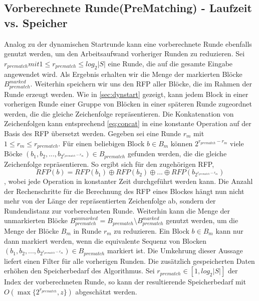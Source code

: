 \subsection{Vorberechnete Runde(PreMatching) - Laufzeit vs. Speicher}
Analog zu der dynamischen Startrunde kann eine vorberechnete Runde ebenfalls genutzt werden, um den Arbeitsaufwand vorheriger Runden zu reduzieren. Sei $r_{prematch} mit 
1\leq r_{prematch} \leq log_2{|S|}$ eine Runde, die auf die gesamte Eingabe angewendet wird. Als Ergebnis erhalten wir die Menge der markierten Blöcke $B_{prematch}^{marked}$.
Weiterhin speichern wir uns den RFP aller Blöcke, die im Rahmen der Runde erzeugt werden. Wie in \ref{sec:dynstart} gezeigt, kann jedem Block in einer vorherigen Runde einer Gruppe
von Blöcken in einer späteren Runde zugeordnet werden, die die gleiche Zeichenfolge repräsentieren. Die Konkatenation von Zeichenfolgen kann entsprechend \ref{eq:concat} in eine
konstante Operation auf der Basis des RFP übersetzt werden. Gegeben sei eine Runde $r_m$ mit $1\leq r_m \leq r_{prematch}$. Für einen beliebigen Block $b \in B_m$ können 
$2^{r_{prematch}-r_m}$ viele Böcke $(b_1, b_2, ..., b_{2^{r_{prematch}-r_m}})\in B_{prematch}$ gefunden werden, die die gleiche Zeichenfolge repräsentieren. So ergibt sich für den 
zugehörigen RFP,
\begin{equation}
    RFP(b) = RFP(b_1) \oplus RFP(b_2) \oplus ... \oplus RFP(b_{2^{r_{prematch}-r_m}})
\end{equation}
, wobei jede Operation in konstanter Zeit durchgeführt werden kann. Die Anzahl der Rechenschritte für die Berechnung des RFP eines Blockes hängt nun nicht mehr von der Länge der
repräsentierten Zeichenfolge ab, sondern der Rundendistanz zur vorberechneten Runde.
Weiterhin kann die Menge der unmarkierten Blöcke $B_{prematch}^{unmarked}=B_{prematch}\setminus B_{prematch}^{marked}$ genutzt werden, um die Menge der Blöcke $B_m$ in Runde $r_m$
zu reduzieren. Ein Block $b \in B_m$ kann nur dann markiert werden, wenn die equivalente Sequenz von Blocken $(b_1, b_2, ..., b_{2^{r_{prematch}-r_m}})\in B_{prematch}$ markiert ist.
Die Umkehrung dieser Aussage liefert einen Filter für alle vorherigen Runden. Die zusätzlich gespeicherten Daten erhöhen den Speicherbedarf des Algorithmus. 
Sei $r_{prematch}\in [1, log_2{|S|}]$ der Index der vorberechneten Runde, so kann der resultierende Speicherbedarf mit $O(\max\{2^{r_{prematch}}, z\})$ abgeschätzt werden.

